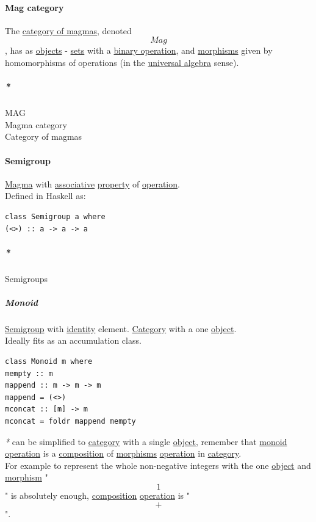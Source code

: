 \documentclass[11pt]{article}
\begin{document}
\paragraph{\label{org9a2cc29}Mag category}
\label{sec:org7474933}
The \hyperref[org5677197]{category of magmas}, denoted $$ Mag $$, has as \hyperref[orge0f000f]{objects} - \hyperref[org4e7443a]{sets} with a \hyperref[orgd89f717]{binary operation}, and \hyperref[org8ed0ce8]{morphisms} given by homomorphisms of operations (in the \hyperref[org5b89945]{universal algebra} sense).\\

\subparagraph{\emph{*}}
\label{sec:orge4926fb}

\label{orgcd5530b}MAG\\
\label{orge1a7ad6}Magma category\\
\label{org5677197}Category of magmas\\

\paragraph{\label{org936e299}Semigroup}
\label{sec:orgd9344b4}
\hyperref[orgc56e426]{Magma} with \hyperref[org31bffbb]{associative} \hyperref[org07ca26b]{property} of \hyperref[org87d485b]{operation}.\\

Defined in Haskell as:\\
\begin{verbatim}
class Semigroup a where
(<>) :: a -> a -> a
\end{verbatim}

\subparagraph{\emph{*}}
\label{sec:org4ddfa09}

\label{org4959251}Semigroups\\

\subparagraph{\label{org8ff50ea}Monoid}
\label{sec:orgc345548}
\hyperref[org936e299]{Semigroup} with \hyperref[org3bbbadd]{identity} element. \hyperref[org3e3a79b]{Category} with a one \hyperref[org025aac8]{object}.\\

Ideally fits as an accumulation class.\\

\begin{verbatim}
class Monoid m where
mempty :: m
mappend :: m -> m -> m
mappend = (<>)
mconcat :: [m] -> m
mconcat = foldr mappend mempty
\end{verbatim}

\emph{*} can be simplified to \hyperref[org3e3a79b]{category} with a single \hyperref[org025aac8]{object}, remember that \hyperref[org8ff50ea]{monoid} \hyperref[org87d485b]{operation} is a \hyperref[org24a8abd]{composition} of \hyperref[org8ed0ce8]{morphisms} \hyperref[org87d485b]{operation} in \hyperref[org3e3a79b]{category}.\\
For example to represent the whole non-negative integers with the one \hyperref[org025aac8]{object} and \hyperref[orgad99fc6]{morphism} "$$ 1 $$" is absolutely enough, \hyperref[org24a8abd]{composition} \hyperref[org87d485b]{operation} is "$$ + $$".\\
\end{document}
